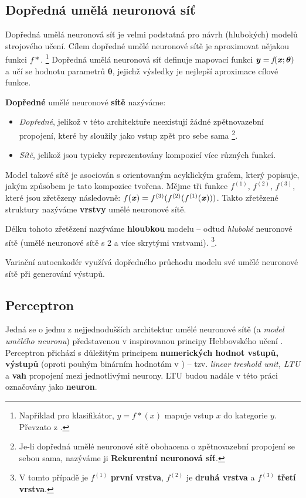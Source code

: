 \subsection{Dopředná umělá neuronová síť}
\label{sec:feedforward_nn}
Dopředná umělá neuronová síť je velmi podstatná pro návrh (hlubokých) modelů strojového učení.
Cílem dopředné umělé neuronové sítě je aproximovat nějakou funkci $f*$.
\footnote{Například pro klasifikátor, $y=f*(x)$ mapuje vstup $x$ do kategorie $y$. Převzato z \cite{Goodfellow2016}.}
Dopředná umělá neuronová síť definuje mapovací funkci $\textbf{\emph{y}} = \emph{f}(\textbf{\emph{x}};\boldsymbol{\theta})$ a učí se hodnotu parametrů $\boldsymbol{\theta}$, jejichž výsledky je nejlepší aproximace cílové funkce. \cite{Goodfellow2016}

\textbf{Dopředné} umělé neuronové \textbf{sítě} nazýváme:
\begin{itemize}
    \item \emph{Dopředné}, jelikož v této architektuře neexistují žádné zpětnovazební propojení, které by sloužily jako vstup zpět pro sebe sama
    \footnote{Je-li dopředná umělé neuronové sítě obohacena o zpětnovazební propojení se sebou sama, nazýváme ji \textbf{Rekurentní neuronová síť}.}.
    \item \emph{Sítě}, jelikož jsou typicky reprezentovány kompozicí více různých funkcí.
\end{itemize}

Model takové sítě je asociován s orientovaným acyklickým grafem, který popisuje, jakým způsobem je tato kompozice tvořena.
Mějme tři funkce $f^{(1)}$, $f^{(2)}$, $f^{(3)}$, které jsou zřetězeny následovně: $f(\textbf{\emph{x}}) = f^{(3)}(f^{(2)}(f^{(1)}(\textbf{\emph{x}})))$.
Takto zřetězené struktury nazýváme \textbf{vrstvy} umělé neuronové sítě. \cite{Goodfellow2016}

Délku tohoto zřetězení nazýváme \textbf{hloubkou} modelu – odtud \emph{hluboké} neuronové sítě (umělé neuronové sítě s 2 a více skrytými vrstvami). \cite{Goodfellow2016}
\footnote{V tomto případě je $f^{(1)}$ \textbf{první vrstva}, $f^{(2)}$ je \textbf{druhá vrstva} a $f^{(3)}$ \textbf{třetí vrstva}.}.

Variační autoenkodér využívá dopředného průchodu modelu své umělé neuronové sítě při generování výstupů. \cite{Kingma2014}

\subsection{Perceptron}
\label{sec:perceptron}
Jedná se o jednu z nejjednodušších architektur umělé neuronové sítě (a \emph{model umělého neuronu}) představenou v \cite{Rosenblatt1957} inspirovanou principy Hebbovského učení \cite{Hebb1949}.
Perceptron přichází s důležitým principem \textbf{numerických hodnot vstupů, výstupů} (oproti pouhým binárním hodnotám v \textcite{McCulloch1943}) – tzv. \emph{linear treshold unit, LTU} a \textbf{vah} propojení mezi jednotlivými neurony. 
LTU budou nadále v této práci označovány jako \textbf{neuron}.

